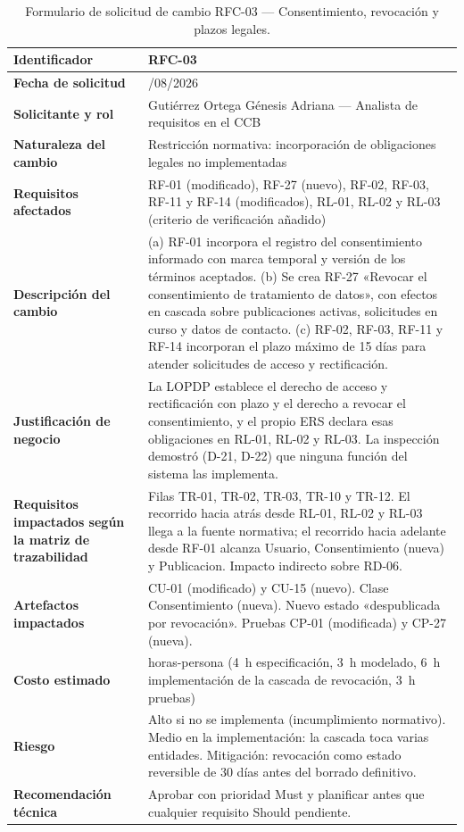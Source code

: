 \documentclass[journal,onecolumn]{IEEEtran}
\begin{document}
	\label{tab:rfc-03}
	\begin{longtable}{
			|>{\raggedright\arraybackslash}p{3.8cm}
			|>{\raggedright\arraybackslash}p{9.7cm}|
		}
		\caption{Formulario de solicitud de cambio RFC-03 — Consentimiento,
			revocación y plazos legales.} \\
		\hline
		\textbf{Identificador} & RFC-03 \\
		\hline
		\textbf{Fecha de solicitud} & 09/08/2026 \\
		\hline
		\textbf{Solicitante y rol} & Gutiérrez Ortega Génesis Adriana —
		Analista de requisitos en el CCB \\
		\hline
		\textbf{Naturaleza del cambio} & Restricción normativa:
		incorporación de obligaciones legales no implementadas \\
		\hline
		\textbf{Requisitos afectados} & RF-01 (modificado), RF-27 (nuevo),
		RF-02, RF-03, RF-11 y RF-14 (modificados), RL-01, RL-02 y RL-03
		(criterio de verificación añadido) \\
		\hline
		\textbf{Descripción del cambio} & (a) RF-01 incorpora el registro
		del consentimiento informado con marca temporal y versión de los
		términos aceptados. (b) Se crea RF-27 «Revocar el consentimiento
		de tratamiento de datos», con efectos en cascada sobre
		publicaciones activas, solicitudes en curso y datos de contacto.
		(c) RF-02, RF-03, RF-11 y RF-14 incorporan el plazo máximo de 15
		días para atender solicitudes de acceso y rectificación. \\
		\hline
		\textbf{Justificación de negocio} & La LOPDP establece el derecho
		de acceso y rectificación con plazo y el derecho a revocar el
		consentimiento, y el propio ERS declara esas obligaciones en
		RL-01, RL-02 y RL-03. La inspección demostró (D-21, D-22) que
		ninguna función del sistema las implementa. \\
		\hline
		\textbf{Requisitos impactados según la matriz de trazabilidad} &
		Filas TR-01, TR-02, TR-03, TR-10 y TR-12. El recorrido hacia atrás
		desde RL-01, RL-02 y RL-03 llega a la fuente normativa; el
		recorrido hacia adelante desde RF-01 alcanza Usuario,
		Consentimiento (nueva) y Publicacion. Impacto indirecto sobre
		RD-06. \\
		\hline
		\textbf{Artefactos impactados} & CU-01 (modificado) y CU-15
		(nuevo). Clase Consentimiento (nueva). Nuevo estado «despublicada
		por revocación». Pruebas CP-01 (modificada) y CP-27 (nueva). \\
		\hline
		\textbf{Costo estimado} & 16 horas-persona (4~h especificación,
		3~h modelado, 6~h implementación de la cascada de revocación, 3~h
		pruebas) \\
		\hline
		\textbf{Riesgo} & Alto si no se implementa (incumplimiento
		normativo). Medio en la implementación: la cascada toca varias
		entidades. Mitigación: revocación como estado reversible de 30
		días antes del borrado definitivo. \\
		\hline
		\textbf{Recomendación técnica} & Aprobar con prioridad Must y
		planificar antes que cualquier requisito Should pendiente. \\
		\hline
	\end{longtable}
	
\end{document}
